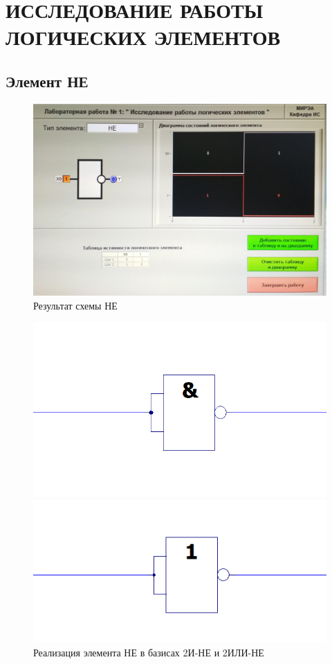 \section{ИССЛЕДОВАНИЕ РАБОТЫ ЛОГИЧЕСКИХ ЭЛЕМЕНТОВ}

\subsection{Элемент НЕ}

\begin{figure}[H]
	\centering
	\includegraphics[width=0.85\linewidth]{imgs/1/not}
	\caption{Результат схемы НЕ}
	\label{fig:1_not}
\end{figure}

\begin{figure}[H]
	\centering
	\begin{minipage}{.45\textwidth}
		\centering
		\includegraphics[width=0.85\linewidth]{imgs/1/not_and}
	\end{minipage}
	\begin{minipage}{.45\textwidth}
		\centering
		\includegraphics[width=0.85\linewidth]{imgs/1/not_or}
	\end{minipage}
	\caption{Реализация элемента НЕ в базисах 2И-НЕ и 2ИЛИ-НЕ}
\end{figure}

